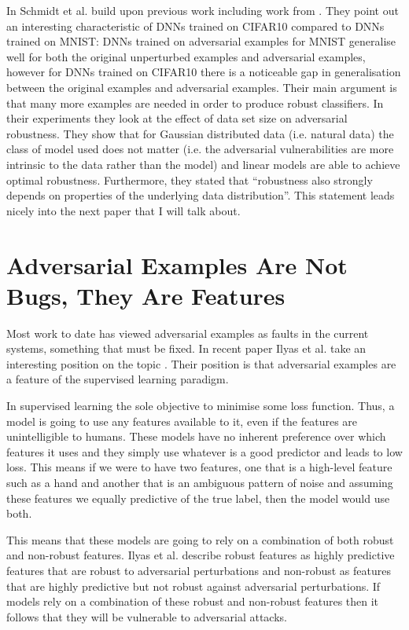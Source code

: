 \documentclass{article}
\begin{document}
In \cite{schmidt2018adversarially} Schmidt et al. build upon previous work including work from \cite{madry2017towards}. They point out an interesting characteristic of DNNs trained on CIFAR10 compared to DNNs trained on MNIST: DNNs trained on adversarial examples for MNIST generalise well for both the original unperturbed examples and adversarial examples, however for DNNs trained on CIFAR10 there is a noticeable gap in generalisation between the original examples and adversarial examples. Their main argument is that many more examples are needed in order to produce robust classifiers. In their experiments they look at the effect of data set size on adversarial robustness. They show that for Gaussian distributed data (i.e. natural data) the class of model used does not matter (i.e. the adversarial vulnerabilities are more intrinsic to the data rather than the model) and linear models are able to achieve optimal robustness. Furthermore, they stated that ``robustness also strongly depends on properties of the underlying data distribution''. This statement leads nicely into the next paper that I will talk about.

\section{Adversarial Examples Are Not Bugs, They Are Features}
Most work to date has viewed adversarial examples as faults in the current systems, something that must be fixed. In recent paper Ilyas et al. take an interesting position on the topic \cite{ilyas2019adversarial}. Their position is that adversarial examples are a feature of the supervised learning paradigm.

In supervised learning the sole objective to minimise some loss function. Thus, a model is going to use any features available to it, even if the features are unintelligible to humans. These models have no inherent preference over which features it uses and they simply use whatever is a good predictor and leads to low loss. This means if we were to have two features, one that is a high-level feature such as a hand and another that is an ambiguous pattern of noise and assuming these features we equally predictive of the true label, then the model would use both.

This means that these models are going to rely on a combination of both robust and non-robust features. Ilyas et al. describe robust features as highly predictive features that are robust to adversarial perturbations and non-robust as features that are highly predictive but not robust against adversarial perturbations. If models rely on a combination of these robust and non-robust features then it follows that they will be vulnerable to adversarial attacks.
\end{document}
